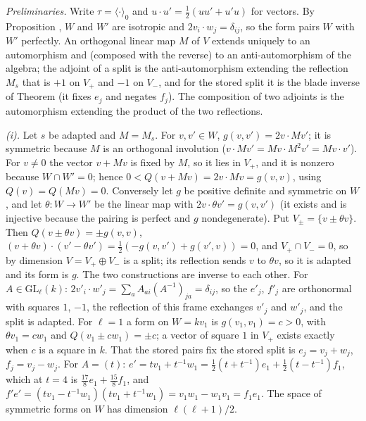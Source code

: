 \emph{Preliminaries.} Write $\tau = \langle\cdot\rangle_{0}$ and $u \cdot u' = \tfrac12(uu' + u'u)$ for vectors. By Proposition , $W$ and $W'$ are isotropic and $2v_{i} \cdot w_{j} = \delta_{ij}$, so the form pairs $W$ with $W'$ perfectly. An orthogonal linear map $M$ of $V$ extends uniquely to an automorphism and (composed with the reverse) to an anti-automorphism of the algebra; the adjoint of a split is the anti-automorphism extending the reflection $M_{s}$ that is $+1$ on $V_{+}$ and $-1$ on $V_{-}$, and for the stored split it is the blade inverse of Theorem  (it fixes $e_{j}$ and negates $f_{j}$). The composition of two adjoints is the automorphism extending the product of the two reflections.

\emph{(i).} Let $s$ be adapted and $M = M_{s}$. For $v, v' \in W$, $g(v,v') = 2v \cdot Mv'$; it is symmetric because $M$ is an orthogonal involution ($v \cdot Mv' = Mv \cdot M^{2}v' = Mv \cdot v'$). For $v \ne 0$ the vector $v + Mv$ is fixed by $M$, so it lies in $V_{+}$, and it is nonzero because $W \cap W' = 0$; hence $0 < Q(v + Mv) = 2v \cdot Mv = g(v,v)$, using $Q(v) = Q(Mv) = 0$. Conversely let $g$ be positive definite and symmetric on $W$, and let $\theta : W \to W'$ be the linear map with $2v \cdot \theta v' = g(v,v')$ (it exists and is injective because the pairing is perfect and $g$ nondegenerate). Put $V_{\pm} = \{v \pm \theta v\}$. Then $Q(v \pm \theta v) = \pm g(v,v)$, $(v + \theta v) \cdot (v' - \theta v') = \tfrac12(-g(v,v') + g(v',v)) = 0$, and $V_{+} \cap V_{-} = 0$, so by dimension $V = V_{+} \oplus V_{-}$ is a split; its reflection sends $v$ to $\theta v$, so it is adapted and its form is $g$. The two constructions are inverse to each other. For $A \in \mathrm{GL}_{\ell}(k)$: $2v'_{i} \cdot w'_{j} = \sum_{a}A_{ai}(A^{-1})_{ja} = \delta_{ij}$, so the $e'_{j}$, $f'_{j}$ are orthonormal with squares $1$, $-1$, the reflection of this frame exchanges $v'_{j}$ and $w'_{j}$, and the split is adapted. For $\ell = 1$ a form on $W = kv_{1}$ is $g(v_{1},v_{1}) = c > 0$, with $\theta v_{1} = cw_{1}$ and $Q(v_{1} \pm cw_{1}) = \pm c$; a vector of square $1$ in $V_{+}$ exists exactly when $c$ is a square in $k$. That the stored pairs fix the stored split is $e_{j} = v_{j} + w_{j}$, $f_{j} = v_{j} - w_{j}$. For $A = (t)$: $e' = tv_{1} + t^{-1}w_{1} = \tfrac12(t + t^{-1})e_{1} + \tfrac12(t - t^{-1})f_{1}$, which at $t = 4$ is $\tfrac{17}{8}e_{1} + \tfrac{15}{8}f_{1}$, and $f'e' = (tv_{1} - t^{-1}w_{1})(tv_{1} + t^{-1}w_{1}) = v_{1}w_{1} - w_{1}v_{1} = f_{1}e_{1}$. The space of symmetric forms on $W$ has dimension $\ell(\ell+1)/2$.

